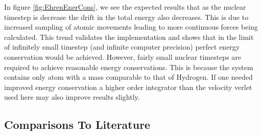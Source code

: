 In figure \ref{fig:EhrenEnerCons}, we see the expected results that as the nuclear timestep is decrease the drift in the total energy also decreases. This is due to increased sampling of atomic movements leading to more continuous forces being calculated. This trend validates the implementation and shows that in the limit of infinitely small timestep (and infinite computer precision) perfect energy conservation would be achieved. However, fairly small nuclear timesteps are required to achieve reasonable energy conservations. This is because the system contains only  atom with a mass comparable to that of Hydrogen. If one needed  improved energy conservation a higher order integrator than the velocity verlet used here may also improve results slightly.

\subsection{Comparisons To Literature}
